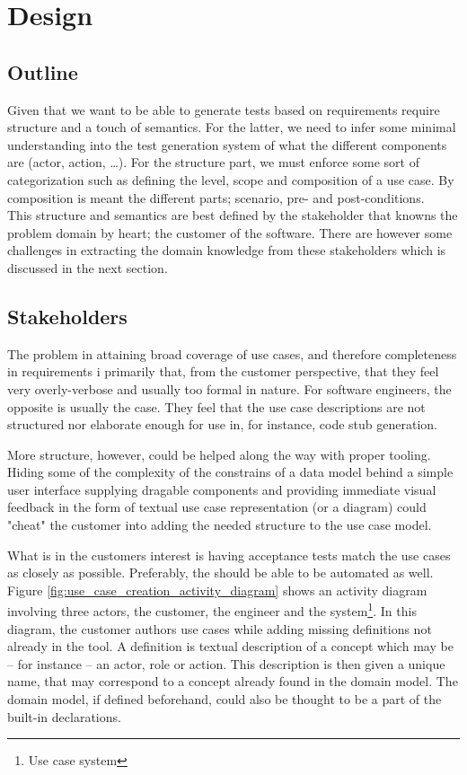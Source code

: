 \chapter{Design}

\section{Outline}
Given that we want to be able to generate tests based on requirements require structure and a touch of semantics. For the latter, we need to infer some minimal understanding into the test generation system of what the different components are (actor, action, \dots). For the structure part, we must enforce some sort of categorization such as defining the level, scope and composition of a use case. By composition is meant the different parts; scenario, pre- and post-conditions.\\
This structure and semantics are best defined by the stakeholder that knowns the problem domain by heart; the customer of the software. There are however some challenges in extracting the domain knowledge from these stakeholders which is discussed in the next section.

\section{Stakeholders}
The problem in attaining broad coverage of use cases, and therefore completeness in requirements i primarily that, from the customer perspective, that they feel very overly-verbose and usually too formal in nature. For software engineers, the opposite is usually the case. They feel that the use case descriptions are not structured nor elaborate enough for use in, for instance, code stub generation.

More structure, however, could be helped along the way with proper tooling. Hiding some of the complexity of the constrains of a data model behind a simple user interface supplying dragable components and providing immediate visual feedback in the form of textual use case representation (or a diagram) could "cheat" the customer into adding the needed structure to the use case model.

What is in the customers interest is having acceptance tests match the use cases as closely as possible. Preferably, the should be able to be automated as well. Figure \ref{fig:use_case_creation_activity_diagram} shows an activity diagram involving three actors, the customer, the engineer and the system\footnote{Use case system}. In this diagram, the customer authors use cases while adding missing definitions not already in the tool. A definition is textual description of a concept which may be -- for instance -- an actor, role or action. This description is then given a unique name, that may correspond to a concept already found in the domain model. The domain model, if defined beforehand, could also be thought to be a part of the built-in declarations.
